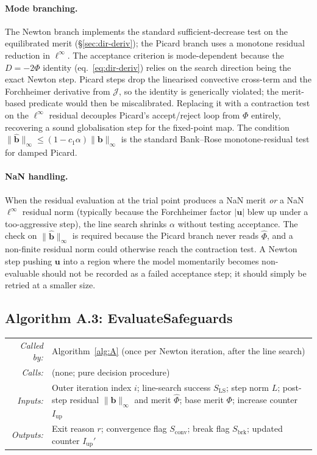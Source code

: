 \documentclass{article}
\makeatletter
\newcommand{\moduleinterface}[4]{%
\begin{interfacecard}
\footnotesize
\begin{tabular}{@{}r@{\quad}p{0.82\textwidth}@{}}
\textit{Called by:} & #1 \\
\textit{Calls:}     & #2 \\
\textit{Inputs:}    & #3 \\
\textit{Outputs:}   & #4 \\
\end{tabular}
\end{interfacecard}
}
\makeatother
\begin{document}
\paragraph{Mode branching.}  The Newton branch implements the standard
sufficient-decrease test on the equilibrated merit (§\ref{sec:dir-deriv});
the Picard branch uses a monotone residual reduction in
$\ell^\infty$. The acceptance criterion is mode-dependent because the
$D = -2\Phi$ identity (eq.~\eqref{eq:dir-deriv}) relies on the search
direction being the exact Newton step. Picard steps drop the linearised
convective cross-term and the Forchheimer derivative from
$\mathcal{J}$, so the identity is generically violated; the merit-based
predicate would then be miscalibrated. Replacing it with a contraction
test on the $\ell^\infty$ residual decouples Picard's accept/reject
loop from $\Phi$ entirely, recovering a sound globalisation step for
the fixed-point map. The condition
$\|\hat{\boldsymbol{b}}\|_\infty \le (1 - c_1\alpha)\|\boldsymbol{b}\|_\infty$
is the standard Bank--Rose monotone-residual test for damped Picard.

\paragraph{NaN handling.}  When the residual evaluation at the trial
point produces a NaN merit \emph{or} a NaN $\ell^\infty$ residual norm
(typically because the Forchheimer factor $|\boldsymbol{u}|$ blew up
under a too-aggressive step), the line search shrinks $\alpha$ without
testing acceptance. The check on $\|\hat{\boldsymbol{b}}\|_\infty$ is
required because the Picard branch never reads $\hat\Phi$, and a
non-finite residual norm could otherwise reach the contraction test.
A Newton step pushing $\boldsymbol{u}$ into a region where the model
momentarily becomes non-evaluable should not be recorded as a failed
acceptance step; it should simply be retried at a smaller size.

\subsection{Algorithm A.3: EvaluateSafeguards}

\moduleinterface
    {Algorithm~\ref{alg:A} (once per Newton iteration, after the line search)}
    {(none; pure decision procedure)}
    {Outer iteration index $i$; line-search success $S_{\mathrm{LS}}$; step norm $L$; post-step residual $\|\hat{\boldsymbol{b}}\|_\infty$ and merit $\hat\Phi$; base merit $\Phi$; increase counter $I_{\mathrm{up}}$}
    {Exit reason $r$; convergence flag $S_{\mathrm{conv}}$; break flag $S_{\mathrm{brk}}$; updated counter $I_{\mathrm{up}}'$}
\end{document}
